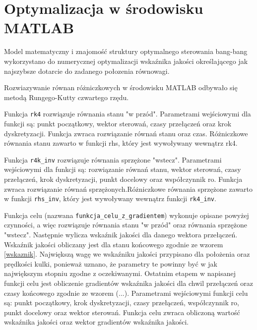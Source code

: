 \section{Optymalizacja w środowisku \textsc{MATLAB}}

Model matematyczny i znajomość struktury optymalnego sterowania bang-bang wykorzystano do numerycznej optymalizacji wskaźnika jakości określającego jak najszybsze dotarcie do zadanego połozenia równowagi.

Rozwiazywanie równan różniczkowych w środowisku MATLAB odbywało się metodą Rungego-Kutty czwartego rzędu. 

Funkcja \texttt{rk4} rozwiązuje równania stanu "w przód". Parametrami wejściowymi dla funkcji są: punkt początkowy,
wektor sterowań, czasy przełączeń oraz krok dyskretyzacji. Funkcja zwraca rozwiązanie równań stanu oraz
czas. Różniczkowe równania stanu zawarto w funkcji rhs, który jest wywoływany wewnątrz rk4.

Funkcja \texttt{r4k\_inv} rozwiązuje równania sprzężone "wstecz". Parametrami wejściowymi dla funkcji są: rozwiązanie
równań stanu, wektor sterowań, czasy przełączeń, krok dyskretyzacji, punkt docelowy oraz współczynnik ro.
Funkcja zwraca rozwiązanie równań sprzężonych.Różniczkowe równania sprzężone zawarto w funkcji \texttt{rhs\_inv}, 
który jest wywoływany wewnątrz funkcji \texttt{rk4\_inv}.

Funkcja celu (nazwana \texttt{funkcja\_celu\_z\_gradientem}) wykonuje opisane powyżej czynności, a więc rozwiązuje 
równania stanu "w przód" oraz równania sprzężone "wstecz". Następnie wylicza wskaźnik jakości dla danego 
wektora przełączeń. Wskaźnik jakości obliczany jest dla stanu końcowego zgodnie ze wzorem \ref{wskaznik}. 
Największą wagę we wskaźniku jakości przypisano dla położenia oraz prędkości kulki, ponieważ uznano, że 
parametry te powinny być w jak największym stopniu zgodne z oczekiwanymi. Ostatnim etapem w napisanej 
funkcji celu jest obliczenie gradientów wskaźnika jakości dla chwil przełączeń oraz czasy końcowego
zgodnie ze wzorem (...). Parametrami wejściowymi funkcji celu są: punkt początkowy, krok dyskretyzacji,
czasy przełączeń, współczynnik ro, punkt docelowy oraz wektor sterowań. Funkcja celu zwraca obliczoną
wartość wskaźnika jakości oraz wektor gradientów wskaźnika jakości.



